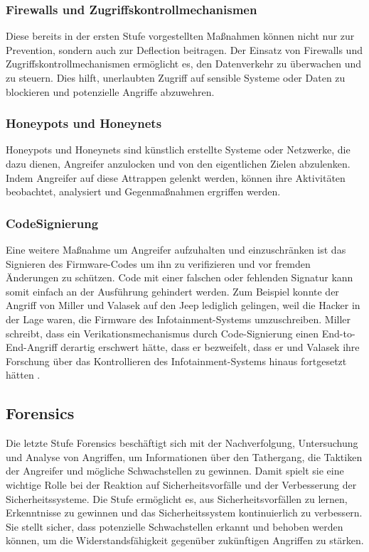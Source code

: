 \subsubsection{Firewalls und Zugriffskontrollmechanismen} 
Diese bereits in der ersten Stufe vorgestellten Maßnahmen können nicht nur zur Prevention, sondern auch zur Deflection beitragen. Der Einsatz von Firewalls und Zugriffskontrollmechanismen ermöglicht es, den Datenverkehr zu überwachen und zu steuern. Dies hilft, unerlaubten Zugriff auf sensible Systeme oder Daten zu blockieren und potenzielle Angriffe abzuwehren.

\subsubsection{Honeypots und Honeynets}
Honeypots und Honeynets sind künstlich erstellte Systeme oder Netzwerke, die dazu dienen, Angreifer anzulocken und von den eigentlichen Zielen abzulenken. Indem Angreifer auf diese Attrappen gelenkt werden, können ihre Aktivitäten beobachtet, analysiert und Gegenmaßnahmen ergriffen werden.


\subsubsection{CodeSignierung}
Eine weitere Maßnahme um Angreifer aufzuhalten und einzuschränken ist das Signieren des Firmware-Codes um ihn zu verifizieren und vor fremden Änderungen zu schützen. Code mit einer falschen oder fehlenden Signatur kann somit einfach an der Ausführung gehindert werden. Zum Beispiel konnte der Angriff von Miller und Valasek auf den Jeep lediglich gelingen, weil die Hacker in der Lage waren, die Firmware des Infotainment-Systems umzuschreiben. Miller schreibt, dass ein Verikationsmechanismus durch Code-Signierung einen End-to-End-Angriff derartig erschwert hätte, dass er bezweifelt, dass er und Valasek ihre Forschung über das Kontrollieren des Infotainment-Systems hinaus fortgesetzt hätten \cite[7]{MillerCharlie.2019}.



\subsection{Forensics}
Die letzte Stufe Forensics beschäftigt sich mit der Nachverfolgung, Untersuchung und Analyse von Angriffen, um Informationen über den Tathergang, die Taktiken der Angreifer und mögliche Schwachstellen zu gewinnen.
Damit spielt sie eine wichtige Rolle bei der Reaktion auf Sicherheitsvorfälle und der Verbesserung der Sicherheitssysteme. Die Stufe ermöglicht es, aus Sicherheitsvorfällen zu lernen, Erkenntnisse zu gewinnen und das Sicherheitssystem kontinuierlich zu verbessern. Sie stellt sicher, dass potenzielle Schwachstellen erkannt und behoben werden können, um die Widerstandsfähigkeit gegenüber zukünftigen Angriffen zu stärken.

